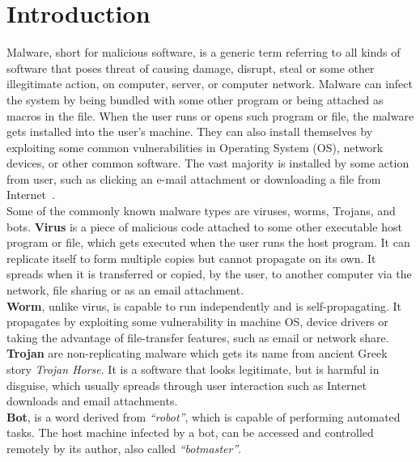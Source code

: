 \chapter{Introduction}\label{chapter:introduction}
Malware, short for malicious software, is a generic term referring to all kinds of software that poses threat of causing damage, disrupt, steal or some other illegitimate action, on computer, server, or computer network.
Malware can infect the system by being bundled with some other program or being attached as macros in the file.
When the user runs or opens such program or file, the malware gets installed into the user's machine.
They can also install themselves by exploiting some common vulnerabilities in Operating System (OS), network devices, or other common software.
The vast majority is installed by some action from user, such as clicking an e-mail attachment or downloading a file from Internet~\cite[]{ciscodif}.\\
Some of the commonly known malware types are viruses, worms, Trojans, and bots.
\textbf{Virus} is a piece of malicious code attached to some other executable host program or file, which gets executed when the user runs the host program.
It can replicate itself to form multiple copies but cannot propagate on its own.
It spreads when it is transferred or copied, by the user, to another computer via the network, file sharing or as an email attachment.\\
\textbf{Worm}, unlike virus, is capable to run independently and is self-propagating.
It propagates by exploiting some vulnerability in machine OS, device drivers or taking the advantage of file-transfer features, such as email or network share.\\
\textbf{Trojan} are non-replicating malware which gets its name from ancient Greek story \textit{Trojan Horse}.
It is a software that looks legitimate, but is harmful in disguise, which usually spreads through user interaction such as Internet downloads and email attachments.\\
\textbf{Bot}, is a word derived from \emph{``robot''}, which is capable of performing automated tasks.
The host machine infected by a bot, can be accessed and controlled remotely by its author, also called \emph{``botmaster''}.
